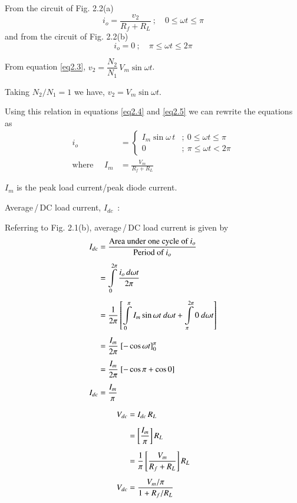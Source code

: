 From the circuit of Fig. 2.2(a)
\begin{equation}
i_o = \frac{v_2}{R_f + R_L}~;\quad 0\leq \omega t \leq \pi \label{eq2.4}
\end{equation}
and from the circuit of Fig. 2.2(b)
\begin{equation}
i_o = 0~;\quad \pi\leq \omega t\leq 2\pi \label{eq2.5}
\end{equation}

From equation \eqref{eq2.3}, $v_2 = \dfrac{N_2}{N_1}\, V_m \sin \omega t$.

Taking $N_2/ N_1 = 1$  we have, $v_2 = V_m \sin \omega t$.

Using this relation in equations \eqref{eq2.4} and \eqref{eq2.5} we can rewrite the
equations as 
\begin{align}
i_o & = \begin{cases}
I_m \sin \omega\,t & ; ~ 0 \leq \omega t \leq \pi\\
0  & ; ~ \pi \leq \omega t < 2 \pi
  \end{cases} \label{eq2.6}\\
\text{where } \quad I_m & = \frac{V_m}{R_f + R_L}\label{eq2.7}
\end{align}

$I_m$ is the peak load current/peak diode current.

Average\,/\,DC load current, $I_{dc}$~:

Referring to Fig. 2.1(b), average\,/\,DC load current is given by
\begin{align}
I_{dc} & = \frac{\text{Area under one cycle of $i_o$}}{\text{Period of
  $i_o$}}\notag\\[4pt]
& = \int\limits^{2\pi}_0 \frac{i_o\,d \omega t}{2 \pi}\notag\\[4pt]
& = \frac{1}{2\pi} \left[\int\limits^\pi_0 I_m \sin \omega t ~ d \omega
  t + \int\limits^{2\pi}_\pi 0 ~ d \omega t\right]\notag\\[4pt]
& = \frac{I_m}{2\pi} \ [-\cos \omega t]^{\pi}_0\notag\\[4pt]
& = \frac{I_m}{2\pi} \ [-\cos \pi + \cos 0]\notag\\[4pt]
I_{dc} & = \frac{I_m}{\pi} \label{eq2.8}
\end{align}

\eject

\begin{align}
V_{dc} & = I_{dc}\, R_L \notag\\[5pt]
& = \left[\frac{I_m}{\pi} \right] R_L \notag\\[5pt]
& = \frac{1}{\pi} \left[\frac{V_m}{R_f + R_L} \right] R_L \notag\\[5pt]
V_{dc} & = \frac{V_m /\pi}{1+ R_f /R_L}\label{eq2.9}
\end{align} 


